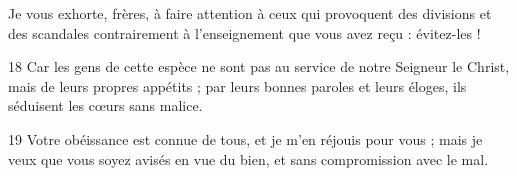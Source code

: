 Je vous exhorte, frères, à faire attention à ceux qui provoquent des divisions et des scandales contrairement à l’enseignement que vous avez reçu : évitez-les !

18 Car les gens de cette espèce ne sont pas au service de notre Seigneur le Christ, mais de leurs propres appétits ; par leurs bonnes paroles et leurs éloges, ils séduisent les cœurs sans malice.

19 Votre obéissance est connue de tous, et je m’en réjouis pour vous ; mais je veux que vous soyez avisés en vue du bien, et sans compromission avec le mal.